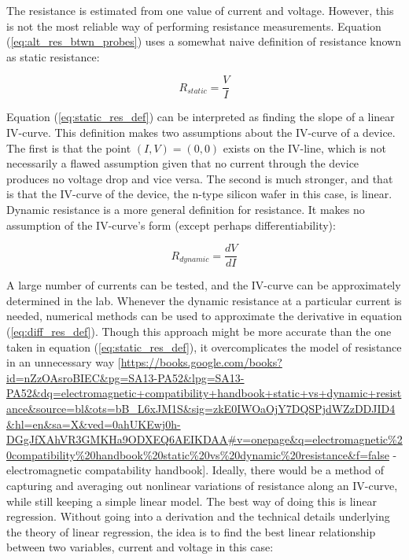 \documentclass{article}
\begin{document}


The resistance is estimated from one value of current and voltage. However, this is not the most reliable way of performing resistance measurements.
Equation (\ref{eq:alt_res_btwn_probes}) uses a somewhat naive definition of resistance known as static resistance:

\begin{equation}
\label{eq:static_res_def}
R_{static} = \frac{V}{I}
\end{equation}

Equation (\ref{eq:static_res_def}) can be interpreted as finding the slope of a linear IV-curve. This definition makes two assumptions about the IV-curve of a device. The first is that the point $(I,V) = (0,0)$ exists on the IV-line, which is not necessarily a flawed assumption given that no current through the device produces no voltage drop and vice versa. The second is much stronger, and that is that the IV-curve of the device, the n-type silicon wafer in this case, is linear.
Dynamic resistance is a more general definition for resistance. It makes no assumption of the IV-curve's form (except perhaps differentiability):

\begin{equation}
\label{eq:diff_res_def}
R_{dynamic} = \frac{dV}{dI}
\end{equation}

A large number of currents can be tested, and the IV-curve can be approximately determined in the lab. Whenever the dynamic resistance at a particular current is needed, numerical methods can be used to approximate the derivative in equation (\ref{eq:diff_res_def}). Though this approach might be more accurate than the one taken in equation (\ref{eq:static_res_def}), it overcomplicates the model of resistance in an unnecessary way [\url{https://books.google.com/books?id=nZzOAsroBIEC&pg=SA13-PA52&lpg=SA13-PA52&dq=electromagnetic+compatibility+handbook+static+vs+dynamic+resistance&source=bl&ots=bB_L6xJM1S&sig=zkE0IWOaOjY7DQSPjdWZzDDJID4&hl=en&sa=X&ved=0ahUKEwj0h-DGgJfXAhVR3GMKHa9ODXEQ6AEIKDAA#v=onepage&q=electromagnetic\%20compatibility\%20handbook\%20static\%20vs\%20dynamic\%20resistance&f=false} - electromagnetic compatability handbook].
Ideally, there would be a method of capturing and averaging out nonlinear variations of resistance along an IV-curve, while still keeping a simple linear model. The best way of doing this is linear regression. Without going into a derivation and the technical details underlying the theory of linear regression, the idea is to find the best linear relationship between two variables, current and voltage in this case:
\end{document}
